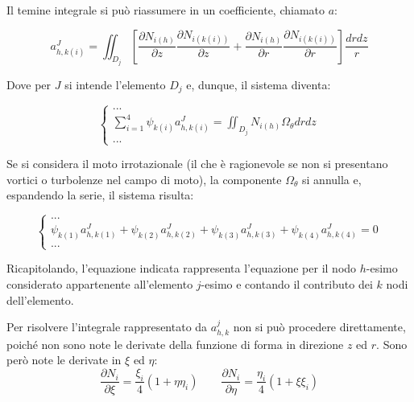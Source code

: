 \documentclass{tufte-handout}
\newcommand{\de}[2]{\dfrac{\partial #1}{\partial #2}}
\begin{document}
Il temine integrale si può riassumere in un coefficiente, chiamato $a$:
\begin{fullwidth}
\begin{equation*}
    a_{h,k(i)}^J = 
    \iint_{D_j} \left[
          \de{N_{i(h)}}{z}\de{N_{i(k(i))}}{z}
        + \de{N_{i(h)}}{r}\de{N_{i(k(i))}}{r}
    \right] \frac{dr dz}{r}
\end{equation*}
\end{fullwidth}
Dove per $J$ si intende l'elemento $D_j$ e, dunque, il sistema diventa:
\begin{fullwidth}
\[
\begin{cases}
    ...\\
    \sum_{i=1}^4
    \psi_{k(i)}
    a_{h,k(i)}^J
    =
    \iint_{D_j} N_{i(h)}\Omega_\theta dr dz \\
    ...
\end{cases}
\]
\end{fullwidth}
Se si considera il moto irrotazionale (il che è ragionevole se non si presentano vortici o turbolenze nel campo di moto), la componente $\Omega_\theta$ si annulla e, espandendo la serie, il sistema risulta:
\begin{fullwidth}
\[
\begin{cases}
    ...\\
    \psi_{k(1)}
    a_{h,k(1)}^J
    +
    \psi_{k(2)}
    a_{h,k(2)}^J
    +
    \psi_{k(3)}
    a_{h,k(3)}^J
    +
    \psi_{k(4)}
    a_{h,k(4)}^J
    =
    0 \\
    ...
\end{cases}
\]
\end{fullwidth}
Ricapitolando, l'equazione indicata rappresenta l'equazione per il nodo $h$-esimo considerato appartenente all'elemento $j$-esimo e contando il contributo dei $k$ nodi dell'elemento.

Per risolvere l'integrale rappresentato da $a_{h,k}^j$ non si può procedere direttamente, poiché non sono note le derivate della funzione di forma in direzione $z$ ed $r$.
Sono però note le derivate in $\xi$ ed $\eta$:
\begin{equation}
    \de{N_i}{\xi}=\frac{\xi_i}{4}(1+\eta \eta_i) \qquad 
    \de{N_i}{\eta}=\frac{\eta_i}{4}(1+\xi \xi_i)
    \label{eq:defdforma}
\end{equation}
\end{document}
